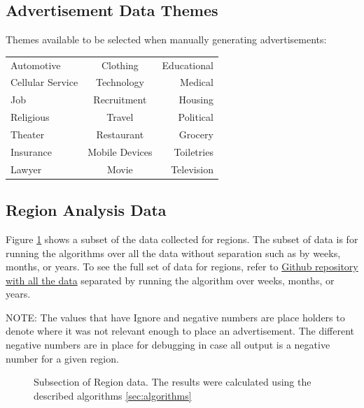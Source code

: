 \documentclass[titlepage,twocolumn]{article}
\begin{document}
\subsection{Advertisement Data Themes}
\label{app:adThemes}
\par Themes available to be selected when manually generating advertisements:
\begin{center}
\begin{tabular} { l c r}
	Automotive & Clothing & Educational \\ 
	Cellular Service & Technology & Medical \\
	Job & Recruitment & Housing \\
	Religious & Travel & Political \\
    Theater & Restaurant & Grocery \\ 
    Insurance & Mobile Devices & Toiletries \\
     Lawyer & Movie & Television \\
\end{tabular}
\end{center}

\onecolumn
\subsection{Region Analysis Data}
\label{seg:regionAnalysisData}
	\par Figure \ref{tab:subTableRegion} shows a subset of the data collected for regions. The subset of data is for running the algorithms over all the data without separation such as by weeks, months, or years. To see the full set of data for regions, refer to \href{https://github.com/gateslm/CSSE-Senior-Thesis/blob/master/Results/finalResultRegion.xlsx}{Github repository with all the data} separated by running the algorithm over weeks, months, or years.

\par NOTE: The values that have Ignore and negative numbers are place holders to denote where it was not relevant enough to place an advertisement. The different negative numbers are in place for debugging in case all output is a negative number for  a given region.

\begin{figure}[htbp]
	\centering
	
  \label{tab:subTableRegion}%
\caption{Subsection of Region data. The results were calculated using the described algorithms \ref{sec:algorithms} }
\end{figure}%
\end{document}

